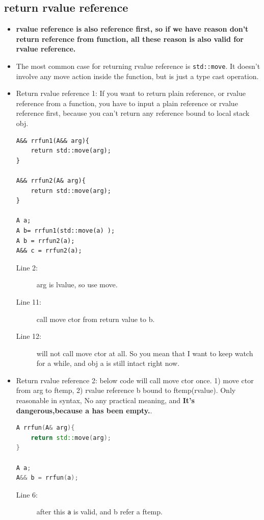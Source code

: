 \documentclass[a4paper,11pt,twoside]{book}
\begin{document}
\subsection{return rvalue reference}
\begin{itemize}
	\item \textbf{rvalue reference is also reference first, so if we have reason don't return reference from function, all these reason is also valid for rvalue reference.}
	
	\item The most common case for returning rvalue reference is \texttt{std::move}. It doesn't involve any move action inside the function, but is just a type cast operation.
	
	\item Return rvalue reference 1: If you want to return plain reference, or rvalue reference from a function, you have to input a plain reference or rvalue reference first, because you can't return any reference bound to local stack obj.
	
\begin{lstlisting}
A&& rrfun1(A&& arg){
	return std::move(arg);	
}
	
A&& rrfun2(A& arg){
	return std::move(arg);
}
	
A a;
A b= rrfun1(std::move(a) );
A b = rrfun2(a);
A&& c = rrfun2(a);
\end{lstlisting}
\begin{description}
	\item[Line 2:] arg is lvalue, so use move.
	\item[Line 11:] call move ctor from return value to b.
	\item[Line 12:] will not call move ctor at all. So you mean that I want to keep watch for a while, and obj a is still intact right now.
\end{description}
 
	\item Return rvalue reference 2:   below code will call move ctor once.  1) move ctor from arg to ftemp, 2) rvalue reference b bound to ftemp(rvalue). Only reasonable in syntax, No any practical meaning, and \textbf{It's dangerous,because a has been empty.}.
\begin{lstlisting}[frame=single, language=c++]
A rrfun(A& arg){
	return std::move(arg);
}
	
A a;
A&& b = rrfun(a);
\end{lstlisting}
\begin{description}
	\item[Line 6:] after this \texttt{a} is valid, and b refer a ftemp.
\end{description}
	

\end{itemize}
\end{document}
